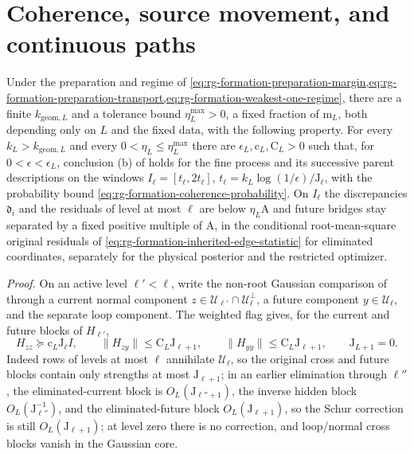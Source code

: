 \section{Coherence, source movement, and continuous paths}
\label{sec:rg-formation-dynamics-transfer}

Under the preparation and regime of
\cref{eq:rg-formation-preparation-margin,eq:rg-formation-preparation-transport,eq:rg-formation-weakest-one-regime},
there are a finite \(k_{\mathrm{geom},L}\) and a tolerance bound
\(\eta_L^{\max}>0\), a fixed fraction of \(\mathrm m_L\), both depending only on
\(L\) and the fixed data, with the following property. For every
\(k_L>k_{\mathrm{geom},L}\) and every \(0<\eta_L\le\eta_L^{\max}\) there are
\(\epsilon_L,\mathrm c_L,\mathrm C_L>0\) such that, for \(0<\epsilon<\epsilon_L\),
conclusion (b) of  holds for the fine
process and its successive parent descriptions on the windows
\(I_\ell=[t_\ell,2t_\ell]\), \(t_\ell=k_L\log(1/\epsilon)/\mathrm J_\ell\), with
the probability bound \cref{eq:rg-formation-coherence-probability}. On
\(I_\ell\) the discrepancies \(\mathfrak d_i\) and the residuals of level at
most \(\ell\) are below \(\eta_L\mathrm A\) and future bridges stay separated
by a fixed positive multiple of \(\mathrm A\), in the conditional
root-mean-square original residuals of
\cref{eq:rg-formation-inherited-edge-statistic} for eliminated coordinates,
separately for the physical posterior and the restricted optimizer.

\noindent\emph{Proof.}
On an active level \(\ell'<\ell\), write the non-root Gaussian comparison of
 through a current normal component
\(z\in\mathcal U_{\ell'}\cap\mathcal U_\ell^\perp\), a future component
\(y\in\mathcal U_\ell\), and the separate loop component. The weighted flag
gives, for the current and future blocks of \(H_{\ell'}\),
\begin{equation}
 H_{zz}\succeq \mathrm c_L\mathrm J_\ell I,
 \qquad \|H_{zy}\|\le \mathrm C_L\mathrm J_{\ell+1},
 \qquad \|H_{yy}\|\le \mathrm C_L\mathrm J_{\ell+1},
 \qquad \mathrm J_{L+1}=0.
 \label{eq:rg-formation-current-future-blocks}
\end{equation}
Indeed rows of levels at most \(\ell\) annihilate \(\mathcal U_\ell\), so the
original cross and future blocks contain only strengths at most
\(\mathrm J_{\ell+1}\); in an earlier elimination through \(\ell''\), the
eliminated-current block is \(O_L(\mathrm J_{\ell''+1})\), the inverse hidden
block \(O_L(\mathrm J_{\ell''}^{-1})\), and the eliminated-future block
\(O_L(\mathrm J_{\ell+1})\), so the Schur correction is still
\(O_L(\mathrm J_{\ell+1})\); at level zero there is no correction, and
loop/normal cross blocks vanish in the Gaussian core.

